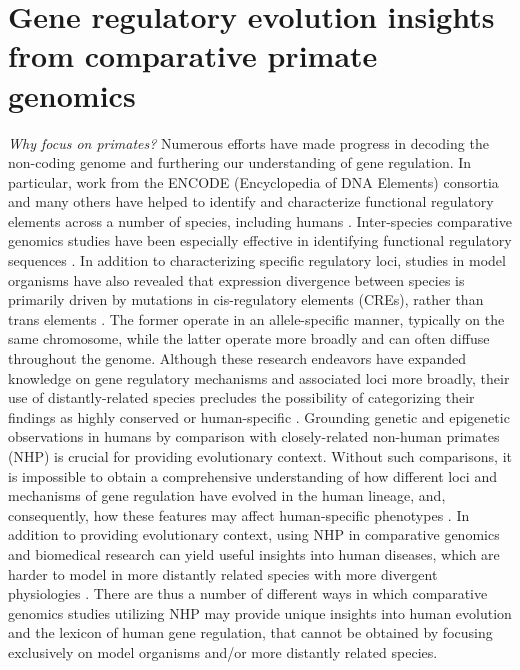 \section{Gene regulatory evolution insights from comparative primate genomics}

\textit{Why focus on primates?} Numerous efforts have made progress in decoding the non-coding genome and furthering our understanding of gene regulation. In particular, work from the ENCODE (Encyclopedia of DNA Elements) consortia and many others have helped to identify and characterize functional regulatory elements across a number of species, including humans \cite{Bernstein.2010, consortium.2012a, consortium.2012, Celniker.2009}. Inter-species comparative genomics studies have been especially effective in identifying functional regulatory sequences \cite{Nobrega.2004}. In addition to characterizing specific regulatory loci, studies in model organisms have also revealed that expression divergence between species is primarily driven by mutations in cis-regulatory elements (CREs), rather than trans elements \cite{Tirosh.2011}. The former operate in an allele-specific manner, typically on the same chromosome, while the latter operate more broadly and can often diffuse throughout the genome. Although these research endeavors have expanded knowledge on gene regulatory mechanisms and associated loci more broadly, their use of distantly-related species precludes the possibility of categorizing their findings as highly conserved or human-specific \cite{Housman.2020}. Grounding genetic and epigenetic observations in humans by comparison with closely-related non-human primates (NHP) is crucial for providing evolutionary context. Without such comparisons, it is impossible to obtain a comprehensive understanding of how different loci and mechanisms of gene regulation have evolved in the human lineage, and, consequently, how these features may affect human-specific phenotypes \cite{Romero.2012}. In addition to providing evolutionary context, using NHP in comparative genomics and biomedical research can yield useful insights into human diseases, which are harder to model in more distantly related species with more divergent physiologies \cite{Rogers.2014}. There are thus a number of different ways in which comparative genomics studies utilizing NHP may provide unique insights into human evolution and the lexicon of human gene regulation, that cannot be obtained by focusing exclusively on model organisms and/or more distantly related species.

